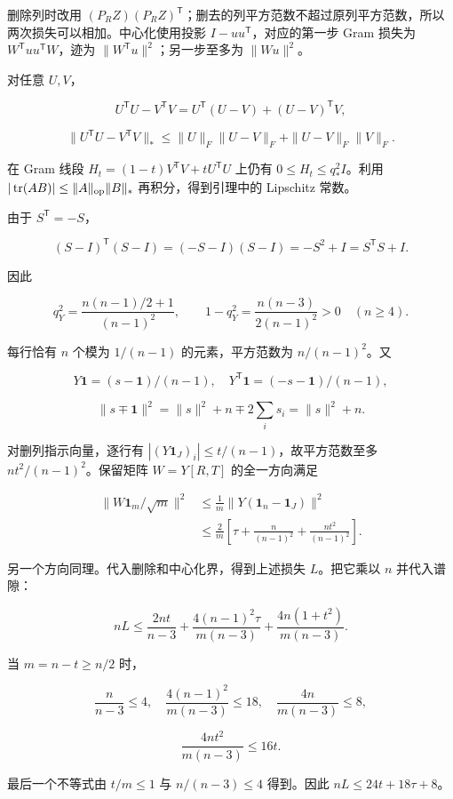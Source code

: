 \documentclass[11pt,a4paper]{article}
\begin{document}
删除列时改用 \((P_RZ)(P_RZ)^{\mathsf T}\)；删去的列平方范数不超过原列平方范数，所以两次损失可以相加。中心化使用投影 \(I-uu^{\mathsf T}\)，对应的第一步 Gram 损失为 \(W^{\mathsf T}uu^{\mathsf T}W\)，迹为 \(\|W^{\mathsf T}u\|^2\)；另一步至多为 \(\|Wu\|^2\)。

对任意 \(U,V\)，

\[
U^{\mathsf T}U-V^{\mathsf T}V
=U^{\mathsf T}(U-V)+(U-V)^{\mathsf T}V,
\]

\[
\|U^{\mathsf T}U-V^{\mathsf T}V\|_*
\le\|U\|_F\|U-V\|_F+\|U-V\|_F\|V\|_F.
\]

在 Gram 线段 \(H_t=(1-t)V^{\mathsf T}V+tU^{\mathsf T}U\) 上仍有 \(0\le H_t\le q_*^2I\)。利用 \(|\operatorname{tr}(AB)|\le\|A\|_{\rm op}\|B\|_*\) 再积分，得到引理中的 Lipschitz 常数。

由于 \(S^{\mathsf T}=-S\)，

\[
(S-I)^{\mathsf T}(S-I)=(-S-I)(S-I)=-S^2+I=S^{\mathsf T}S+I.
\]

因此

\[
q_Y^2=\frac{n(n-1)/2+1}{(n-1)^2},\qquad
1-q_Y^2=\frac{n(n-3)}{2(n-1)^2}>0\quad(n\ge4).
\]

每行恰有 \(n\) 个模为 \(1/(n-1)\) 的元素，平方范数为 \(n/(n-1)^2\)。又

\[
Y\mathbf1=(s-\mathbf1)/(n-1),\quad
Y^{\mathsf T}\mathbf1=(-s-\mathbf1)/(n-1),
\]

\[
\|s\mp\mathbf1\|^2=\|s\|^2+n\mp2\sum_i s_i=\|s\|^2+n.
\]

对删列指示向量，逐行有 \(|(Y\mathbf1_J)_i|\le t/(n-1)\)，故平方范数至多 \(nt^2/(n-1)^2\)。保留矩阵 \(W=Y[R,T]\) 的全一方向满足

\[
\begin{aligned}
\|W\mathbf1_m/\sqrt m\|^2
&\le\frac1m\|Y(\mathbf1_n-\mathbf1_J)\|^2\\
&\le\frac2m\left[\tau+\frac n{(n-1)^2}+\frac{nt^2}{(n-1)^2}\right].
\end{aligned}
\]

另一个方向同理。代入删除和中心化界，得到上述损失 \(L\)。把它乘以 \(n\) 并代入谱隙：

\[
nL\le\frac{2nt}{n-3}
+\frac{4(n-1)^2\tau}{m(n-3)}
+\frac{4n(1+t^2)}{m(n-3)}.
\]

当 \(m=n-t\ge n/2\) 时，

\[
\frac n{n-3}\le4,\quad
\frac{4(n-1)^2}{m(n-3)}\le18,\quad
\frac{4n}{m(n-3)}\le8,
\]

\[
\frac{4nt^2}{m(n-3)}\le16t.
\]

最后一个不等式由 \(t/m\le1\) 与 \(n/(n-3)\le4\) 得到。因此 \(nL\le24t+18\tau+8\)。
\end{document}
